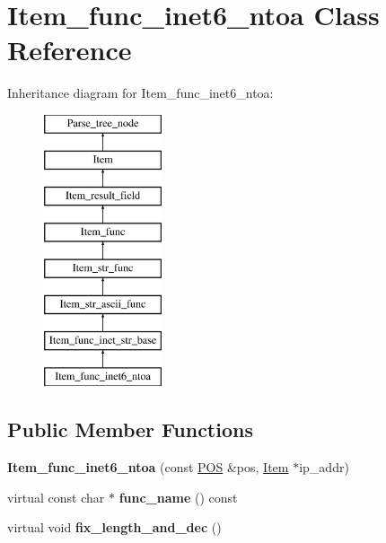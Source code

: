 \hypertarget{classItem__func__inet6__ntoa}{}\section{Item\+\_\+func\+\_\+inet6\+\_\+ntoa Class Reference}
\label{classItem__func__inet6__ntoa}
Inheritance diagram for Item\+\_\+func\+\_\+inet6\+\_\+ntoa\+:\begin{figure}[H]
\begin{center}
\leavevmode
\includegraphics[height=8.000000cm]{classItem__func__inet6__ntoa}
\end{center}
\end{figure}
\subsection*{Public Member Functions}
\begin{DoxyCompactItemize}
\item 
\mbox{\label{classItem__func__inet6__ntoa_a5b39b203bd7658680d34a7e09745b686}} 
{\bfseries Item\+\_\+func\+\_\+inet6\+\_\+ntoa} (const \mbox{\hyperlink{structYYLTYPE}{P\+OS}} \&pos, \mbox{\hyperlink{classItem}{Item}} $\ast$ip\+\_\+addr)
\item 
\mbox{\label{classItem__func__inet6__ntoa_a659a61d7cffe9a87dfe215d679573cd5}} 
virtual const char $\ast$ {\bfseries func\+\_\+name} () const
\item 
\mbox{\label{classItem__func__inet6__ntoa_ada35722df0d244579c79cd869c99cc69}} 
virtual void {\bfseries fix\+\_\+length\+\_\+and\+\_\+dec} ()
\end{DoxyCompactItemize}
